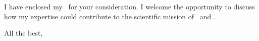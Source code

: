 \documentclass[10.5pt]{article}
\begin{document}
I have enclosed my \supplementList\ for your consideration. 
I welcome the opportunity to discuss how my expertise could contribute to the scientific mission of \RecipientInstitution\ and \HostGroupDescriptor.

\vspace{1.5em}
All the best,\\ \\ \\
\ApplicantName
\end{document}
